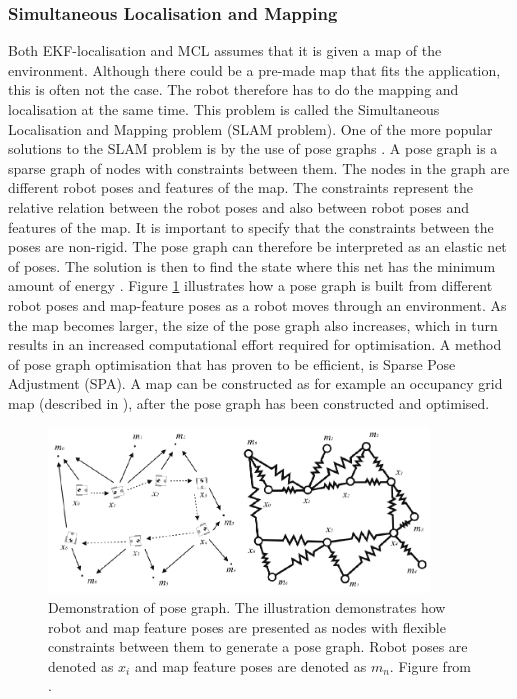 \subsubsection{Simultaneous Localisation and Mapping} \label{sec:T:AN:L:SLAM}
Both EKF-localisation and MCL assumes that it is given a map of the environment. Although there could be a pre-made map that fits the application, this is often not the case. The robot therefore has to do the mapping and localisation at the same time. This problem is called the Simultaneous Localisation and Mapping problem (SLAM problem). One of the more popular solutions to the SLAM problem is by the use of pose graphs \cite{Konolige2010}. A pose graph is a sparse graph of nodes with constraints between them. The nodes in the graph are different robot poses and features of the map. The constraints represent the relative relation between the robot poses and also between robot poses and features of the map. It is important to specify that the constraints between the poses are non-rigid. The pose graph can therefore be interpreted as an elastic net of poses. The solution is then to find the state where this net has the minimum amount of energy \cite{SiegwartRoland2011Itam}. Figure \ref{fig:poseGraph} illustrates how a pose graph is built from different robot poses and map-feature poses as a robot moves through an environment. As the map becomes larger, the size of the pose graph also increases, which in turn results in an increased computational effort required for optimisation. A method of pose graph optimisation that has proven to be efficient, is Sparse Pose Adjustment (SPA)\cite{Konolige2010}. A map can be constructed as for example an occupancy grid map (described in \cite{ThrunSebastian2005Pr}), after the pose graph has been constructed and optimised. 

\begin{figure}[htp]
  \centering
  \includegraphics[width = 0.9\textwidth]{Figures/figposeGraph.pdf}
  \caption{Demonstration of pose graph. The illustration demonstrates how robot and map feature poses are presented as nodes with flexible constraints between them to generate a pose graph. Robot poses are denoted as $x_i$ and map feature poses are denoted as $m_n$. Figure from \cite{SiegwartRoland2011Itam}.}
  \label{fig:poseGraph}
\end{figure}

